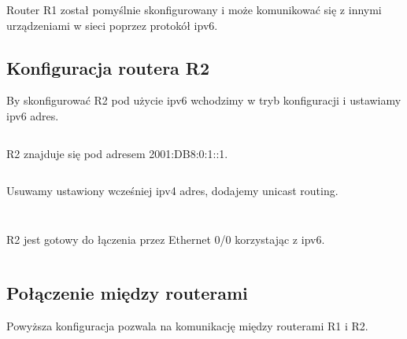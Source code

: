 \documentclass[a4paper,12pt,notitlepage]{article}
\begin{document}
Router R1 został pomyślnie skonfigurowany i może komunikować się z innymi urządzeniami w sieci poprzez protokół ipv6.

\subsection{Konfiguracja routera R2}

By skonfigurować R2 pod użycie ipv6 wchodzimy w tryb konfiguracji i ustawiamy ipv6 adres.
\inputminted[label=Output, firstline=272, lastline=283]{text}{R2.txt}
R2 znajduje się pod adresem 2001:DB8:0:1::1.
\inputminted[label=Output, firstline=309, lastline=323]{text}{R2.txt}
Usuwamy ustawiony wcześniej ipv4 adres, dodajemy unicast routing.
\inputminted[label=Output, firstline=324, lastline=329]{text}{R2.txt}
\inputminted[label=Output, firstline=376, lastline=382]{text}{R2.txt}
R2 jest gotowy do łączenia przez Ethernet 0/0 korzystając z ipv6.
\inputminted[label=Output, firstline=383, lastline=402]{text}{R2.txt}

\subsection{Połączenie między routerami}

Powyższa konfiguracja pozwala na komunikację między routerami R1 i R2.%
\inputminted[label=Próba komunikacji R2 z R1, firstline=416, lastline=421]{text}{R2.txt}%
\inputminted[label=Próba komunikacji R1 z R2, firstline=248, lastline=253]{text}{R1.txt}
\end{document}
